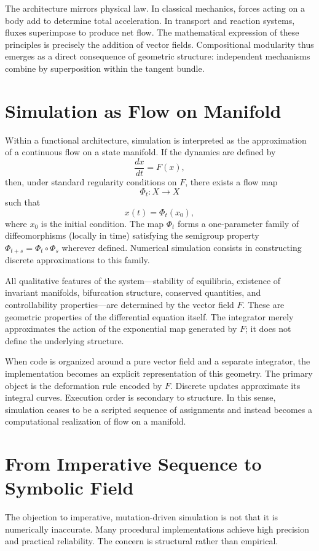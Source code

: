 \documentclass[12pt]{book}
\begin{document}
The architecture mirrors physical law. In classical mechanics, forces
acting on a body add to determine total acceleration. In transport and
reaction systems, fluxes superimpose to produce net flow. The
mathematical expression of these principles is precisely the addition
of vector fields. Compositional modularity thus emerges as a direct
consequence of geometric structure: independent mechanisms combine by
superposition within the tangent bundle.

\section{Simulation as Flow on Manifold}

Within a functional architecture, simulation is interpreted as the
approximation of a continuous flow on a state manifold. If the dynamics
are defined by
\[
\frac{dx}{dt} = F(x),
\]
then, under standard regularity conditions on $F$, there exists a flow
map
\[
\Phi_t : X \to X
\]
such that
\[
x(t) = \Phi_t(x_0),
\]
where $x_0$ is the initial condition. The map $\Phi_t$ forms a
one-parameter family of diffeomorphisms (locally in time) satisfying
the semigroup property $\Phi_{t+s} = \Phi_t \circ \Phi_s$ wherever
defined. Numerical simulation consists in constructing discrete
approximations to this family.

All qualitative features of the system---stability of equilibria,
existence of invariant manifolds, bifurcation structure, conserved
quantities, and controllability properties---are determined by the
vector field $F$. These are geometric properties of the differential
equation itself. The integrator merely approximates the action of the
exponential map generated by $F$; it does not define the underlying
structure.

When code is organized around a pure vector field and a separate
integrator, the implementation becomes an explicit representation of
this geometry. The primary object is the deformation rule encoded by
$F$. Discrete updates approximate its integral curves. Execution order
is secondary to structure. In this sense, simulation ceases to be a
scripted sequence of assignments and instead becomes a computational
realization of flow on a manifold.

\section{From Imperative Sequence to Symbolic Field}

The objection to imperative, mutation-driven simulation is not that it
is numerically inaccurate. Many procedural implementations achieve
high precision and practical reliability. The concern is structural
rather than empirical.
\end{document}
